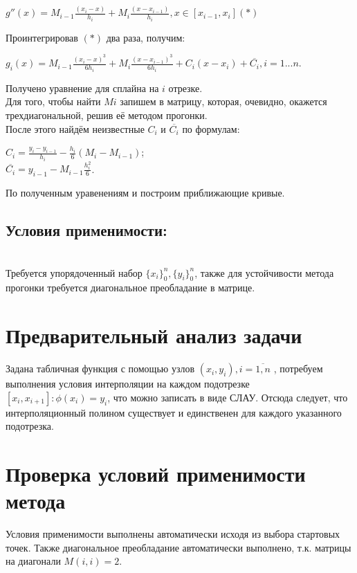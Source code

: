 \documentclass[12pt]{article}
\begin{document}
\begin{center}
$\displaystyle g''(x) = M_{i-1}\frac{(x_i - x)}{h_i} + M_{i}\frac{(x - x_{i-1})}{h_i}, x\in [x_{i-1},x_i] (*)$\\
\end{center}
Проинтегрировав $(*)$ два раза, получим: \begin{center}
$ \displaystyle g_i(x) =  M_{i-1}\frac{(x_i - x)^3}{6h_i} +  M_{i}\frac{(x - x_{i-1})^3}{6h_i} + C_i(x-x_i) + \overline{C_i}, i = 1...n$.\\
\end{center}
Получено уравнение для сплайна на $i$ отрезке.\\
Для того, чтобы найти $Mi$ запишем в матрицу, которая, очевидно, окажется трехдиагональной, решив её методом прогонки.\\
После этого найдём неизвестные $C_i$ и $\overline{C_i}$ по формулам:\\
\begin{center}
 $\displaystyle C_i = \frac{y_i - y_{i-1}}{h_i} - \frac{h_i}{6}(M_i - M_{i-1})$;\\
$\displaystyle \overline{C_i} = y_{i-1} - M_{i-1}\frac{h_i^2}{6}$.\\   
\end{center}
По полученным уравенениям и построим приближающие кривые.
\subsection{Условия применимости:}\\
Требуется упорядоченный набор $\{{x_i}\}_0^n, \{{y_i}\}_0^n$, также для устойчивости метода прогонки требуется диагональное преобладание в матрице.
\section{Предварительный анализ задачи}
Задана табличная функция с помощью узлов $(x_i, y_i), i = \overline{1,n}$ , потребуем выполнения условия интерполяции на каждом подотрезке $[x_i, x_{i+1}]:\phi(x_i) = y_i$, что можно записать в виде СЛАУ. Отсюда следует, что интерполяционный полином существует и единственен для каждого указанного подотрезка.\\
\section{Проверка условий применимости метода}
Условия применимости выполнены автоматически исходя из выбора стартовых точек. Также диагональное преобладание автоматически выполнено, т.к. матрицы на диагонали $M(i,i) = 2$.\\
\end{document}
